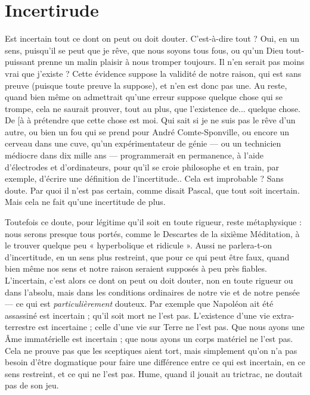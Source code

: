 \section{Incertirude}
Est incertain tout ce dont on peut ou doit douter. C’est-à-dire
tout ? Oui, en un sens, puisqu'il se peut que je rêve,
que nous soyons tous fous, ou qu’un Dieu tout-puissant prenne un malin
plaisir à nous tromper toujours. Il n’en serait pas moins vrai que j’existe ?
Cette évidence suppose la validité de notre raison, qui est sans preuve (puisque
toute preuve la suppose), et n’en est donc pas une. Au reste, quand bien même
on admettrait qu’une erreur suppose quelque chose qui se trompe, cela ne saurait
prouver, tout au plus, que l’existence de... quelque chose. De [à à prétendre
que cette chose est moi. Qui sait si je ne suis pas le rêve d’un autre, ou
bien un fou qui se prend pour André Comte-Sponville, ou encore un cerveau
dans une cuve, qu’un expérimentateur de génie — ou un technicien médiocre
dans dix mille ans — programmerait en permanence, à l’aide d’électrodes et
d’ordinateurs, pour qu’il se croie philosophe et en train, par exemple, d’écrire
une définition de l’incertitude.. Cela est improbable ? Sans doute. Par quoi il
n’est pas certain, comme disait Pascal, que tout soit incertain. Mais cela ne fait
qu’une incertitude de plus.

Toutefois ce doute, pour légitime qu’il soit en toute rigueur, reste
métaphysique : nous serons presque tous portés, comme le Descartes de la
sixième Méditation, à le trouver quelque peu « hyperbolique et ridicule ». Aussi
ne parlera-t-on d’incertitude, en un sens plus restreint, que pour ce qui peut
être faux, quand bien même nos sens et notre raison seraient supposés à peu
près fiables. L’incertain, c’est alors ce dont on peut ou doit douter, non en
toute rigueur ou dans l’absolu, mais dans les conditions ordinaires de notre vie
et de notre pensée — ce qui est {\it particulièrement} douteux. Par exemple que
Napoléon ait été assassiné est incertain ; qu’il soit mort ne l’est pas. L'existence
d’une vie extra-terrestre est incertaine ; celle d’une vie sur Terre ne l’est pas.
Que nous ayons une Âme immatérielle est incertain ; que nous ayons un corps
matériel ne l’est pas. Cela ne prouve pas que les sceptiques aient tort, mais simplement
qu’on n’a pas besoin d’être dogmatique pour faire une différence entre
ce qui est incertain, en ce sens restreint, et ce qui ne l’est pas. Hume, quand il
jouait au trictrac, ne doutait pas de son jeu.

